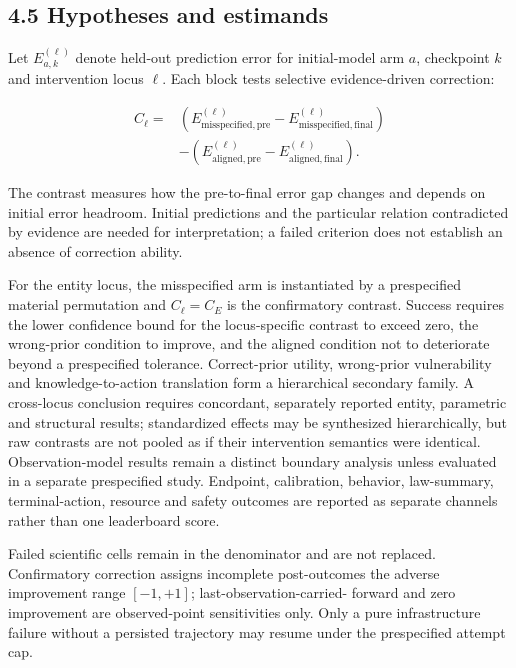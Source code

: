 \documentclass[10pt,twocolumn]{article}
\begin{document}
\subsection{4.5 Hypotheses and
estimands}\label{hypotheses-and-estimands}

Let \(E_{a,k}^{(\ell)}\) denote held-out prediction error for
initial-model arm \(a\), checkpoint \(k\) and intervention locus
\(\ell\). Each block tests selective evidence-driven correction:

\[
\begin{aligned}
C_{\ell}={}&
  (E^{(\ell)}_{\mathrm{misspecified,pre}}-E^{(\ell)}_{\mathrm{misspecified,final}})\\
&-(E^{(\ell)}_{\mathrm{aligned,pre}}-E^{(\ell)}_{\mathrm{aligned,final}}).
\end{aligned}
\]

The contrast measures how the pre-to-final error gap changes and depends
on initial error headroom. Initial predictions and the particular
relation contradicted by evidence are needed for interpretation; a
failed criterion does not establish an absence of correction ability.

For the entity locus, the misspecified arm is instantiated by a
prespecified material permutation and \(C_{\ell}=C_E\) is the
confirmatory contrast. Success requires the lower confidence bound for
the locus-specific contrast to exceed zero, the wrong-prior condition to
improve, and the aligned condition not to deteriorate beyond a
prespecified tolerance. Correct-prior utility, wrong-prior vulnerability
and knowledge-to-action translation form a hierarchical secondary
family. A cross-locus conclusion requires concordant, separately
reported entity, parametric and structural results; standardized effects
may be synthesized hierarchically, but raw contrasts are not pooled as
if their intervention semantics were identical. Observation-model
results remain a distinct boundary analysis unless evaluated in a
separate prespecified study. Endpoint, calibration, behavior,
law-summary, terminal-action, resource and safety outcomes are reported
as separate channels rather than one leaderboard score.

Failed scientific cells remain in the denominator and are not replaced.
Confirmatory correction assigns incomplete post-outcomes the adverse
improvement range \([-1,+1]\); last-observation-carried- forward and
zero improvement are observed-point sensitivities only. Only a pure
infrastructure failure without a persisted trajectory may resume under
the prespecified attempt cap.
\end{document}
